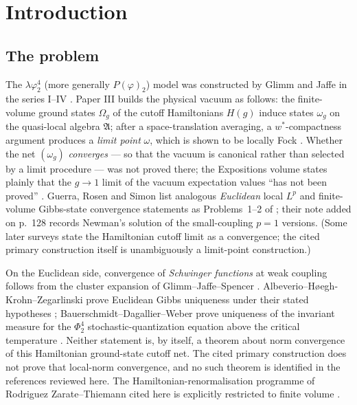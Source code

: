 \documentclass[11pt,a4paper]{article}
\theoremstyle{plain}
\theoremstyle{definition}
\theoremstyle{plain}
\theoremstyle{definition}
\newcommand{\A}{\mathfrak{A}}
\newcommand{\Om}{\Omega}
\begin{document}
\tableofcontents

\section{Introduction}\label{sec:intro}

\subsection{The problem}

The $\lambda\varphi^4_2$ (more generally $P(\varphi)_2$) model was constructed by Glimm and
Jaffe in the series I--IV \cite{GJ1,GJ2,GJ3,GJ4}. Paper III builds the physical vacuum as
follows: the finite-volume ground states $\Om_g$ of the cutoff Hamiltonians $H(g)$ induce states
$\omega_g$ on the quasi-local algebra $\A$; after a space-translation averaging, a
$w^*$-compactness argument produces a \emph{limit point} $\omega$, which is shown to be locally
Fock \cite[Thms.~2.1--2.3]{GJ3}. Whether the net $(\omega_g)$ \emph{converges} --- so that the
vacuum is canonical rather than selected by a limit procedure --- was not proved there; the
Expositions volume states plainly that the $g\to1$ limit of the vacuum expectation values ``has
not been proved'' \cite[\S4]{GJExp}. Guerra, Rosen and Simon list analogous \emph{Euclidean}
local $L^p$ and finite-volume Gibbs-state convergence statements as Problems~1--2 of
\cite[pp.~125--126]{GRS75}; their note added on p.~128 records Newman's solution of the
small-coupling $p=1$ versions. (Some later surveys state the Hamiltonian cutoff limit as a
convergence; the cited primary construction itself is unambiguously a limit-point
construction.)

On the Euclidean side, convergence of \emph{Schwinger functions} at weak coupling follows from
the cluster expansion of Glimm--Jaffe--Spencer \cite{GJS}. Albeverio--H\o egh-Krohn--Zegarlinski
prove Euclidean Gibbs uniqueness under their stated hypotheses \cite{AHZ};
Bauerschmidt--Dagallier--Weber prove uniqueness of the invariant measure for the $\Phi^4_2$
stochastic-quantization equation above the critical temperature \cite{BDW}. Neither statement
is, by itself, a theorem about norm convergence of this Hamiltonian ground-state cutoff net.
The cited primary construction does not prove that local-norm convergence, and no such theorem
is identified in the references reviewed here. The Hamiltonian-renormalisation programme of
Rodriguez Zarate--Thiemann cited here is explicitly restricted to finite volume \cite{RZT}.
\end{document}
